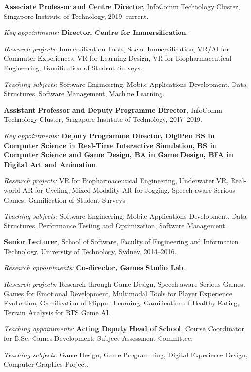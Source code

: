 \documentclass[10pt,a4paper]{article}
\renewenvironment{itemize}{
  \begin{list}{}{
    \setlength{\leftmargin}{1.5em}
    \setlength{\itemsep}{0.25em}
    \setlength{\parskip}{0pt}
    \setlength{\parsep}{0.25em}
  }
}{
  \end{list}
}
\begin{document}
\begin{itemize}
\item \textbf{Associate Professor and Centre Director}, InfoComm Technology Cluster, Singapore Institute of Technology,
	2019--current.
    \begin{itemize}
    	\item \textit{Key appointments:} \textbf{Director, Centre for Immersification}.
        \item \textit{Research projects:} Immersification Tools, Social Immersification, VR/AI for Commuter Experiences, VR for Learning Design, VR for Biopharmaceutical Engineering, Gamification of Student Surveys.
        \item \textit{Teaching subjects:} Software Engineering, Mobile Applications Development, Data Structures, Software Management, Machine Learning.
    \end{itemize}

\item \textbf{Assistant Professor and Deputy Programme Director}, InfoComm Technology Cluster, Singapore Institute of Technology,
	2017--2019.
    \begin{itemize}
    	\item \textit{Key appointments:} \textbf{Deputy Programme Director, DigiPen BS in Computer Science in Real-Time Interactive Simulation, BS in Computer Science and Game Design, BA in Game Design, BFA in Digital Art and Animation}.
        \item \textit{Research projects:} VR for Biopharmaceutical Engineering, Underwater VR, Real-world AR for Cycling, Mixed Modality AR for Jogging, Speech-aware Serious Games, Gamification of Student Surveys.
        \item \textit{Teaching subjects:} Software Engineering, Mobile Applications Development, Data Structures, Performance Testing and Optimization, Software Management.
    \end{itemize}

\item \textbf{Senior Lecturer}, School of Software, Faculty of Engineering and Information Technology, University of Technology, Sydney,
	2014--2016.
    \begin{itemize}
        \item \textit{Research appointments:} \textbf{Co-director, Games Studio Lab}.
        \item \textit{Research projects:} Research through Game Design, Speech-aware Serious Games, Games for Emotional Development, Multimodal Tools for Player Experience Evaluation, Gamification of Flipped Learning, Gamification of Healthy Eating, Terrain Analysis for RTS Game AI.
        \item \textit{Teaching appointments:} \textbf{Acting Deputy Head of School}, Course Coordinator for B.Sc. Games Development, Subject Assessment Committee.
        \item \textit{Teaching subjects:} Game Design, Game Programming, Digital Experience Design, Computer Graphics Project.
    \end{itemize}


\end{itemize}
\end{document}
